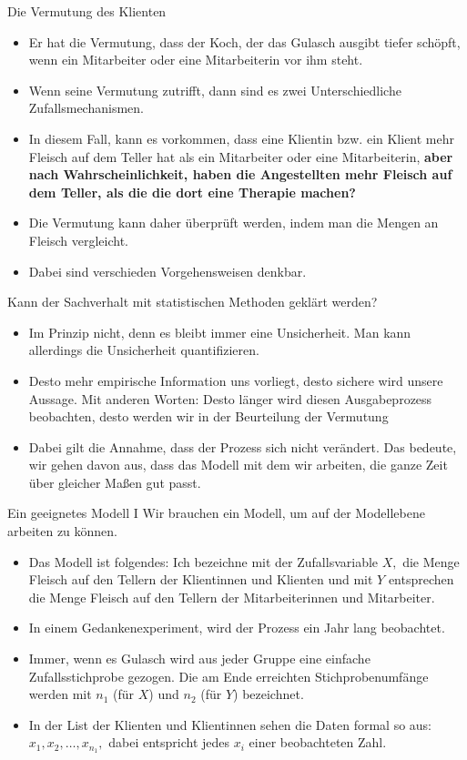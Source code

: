 \documentclass[usenames,dvipsnames,handout]{beamer}
\begin{document}
\begin{frame}{Die Vermutung des Klienten}
\begin{itemize}
\item{Er hat die Vermutung, dass der Koch, der das Gulasch ausgibt tiefer schöpft, wenn ein Mitarbeiter oder eine Mitarbeiterin 
vor ihm steht.}\pause
\item{Wenn seine Vermutung zutrifft, dann sind es zwei Unterschiedliche Zufallsmechanismen.}\pause
\item{In diesem Fall, kann es vorkommen, dass eine Klientin bzw. ein Klient mehr Fleisch auf dem Teller
hat als ein Mitarbeiter oder eine Mitarbeiterin, \textbf{aber nach Wahrscheinlichkeit, haben die Angestellten mehr
Fleisch auf dem Teller, als die die dort eine Therapie machen?}}\pause
\item{Die Vermutung kann daher überprüft werden, indem man die Mengen an Fleisch vergleicht.}\pause
\item{Dabei sind verschieden Vorgehensweisen denkbar.}
\end{itemize}
\end{frame}

\begin{frame}{Kann der Sachverhalt mit statistischen Methoden geklärt werden?}
\begin{itemize}
\item{Im Prinzip nicht, denn es bleibt immer eine Unsicherheit. Man kann allerdings
die Unsicherheit quantifizieren.}\pause
\item{Desto mehr empirische Information uns vorliegt, desto sichere wird unsere Aussage. Mit anderen Worten:
Desto länger wird diesen Ausgabeprozess beobachten, desto werden wir in der Beurteilung der Vermutung 
}\pause
\item{Dabei gilt die Annahme, dass der Prozess sich nicht verändert. Das bedeute, wir gehen davon aus, dass das Modell mit dem wir arbeiten,
die ganze Zeit über gleicher Maßen gut passt.}\pause
\end{itemize}
\end{frame}

\begin{frame}{Ein geeignetes Modell I}
Wir brauchen ein Modell, um auf der Modellebene arbeiten zu können.
\begin{itemize}
\item{Das Modell ist folgendes: Ich bezeichne mit der Zufallsvariable $X,$ die Menge Fleisch auf den Tellern
der Klientinnen und Klienten und mit $Y$ entsprechen die Menge Fleisch auf den Tellern der 
Mitarbeiterinnen und Mitarbeiter. }
\item{In einem Gedankenexperiment, wird der Prozess ein Jahr lang beobachtet.}
\item{Immer, wenn es Gulasch wird aus jeder Gruppe eine einfache Zufallsstichprobe  gezogen. Die am Ende erreichten Stichprobenumfänge
werden mit $n_{1}$ (für $X$) und $n_{2}$ (für $Y$) bezeichnet.}
\item{In der List der Klienten und Klientinnen sehen die Daten formal so aus:
$x_{1},x_{2},\dots,x_{n_{1}},$ dabei entspricht jedes $x_{i}$ einer beobachteten Zahl. }
\end{itemize}
\end{frame}
\end{document}
